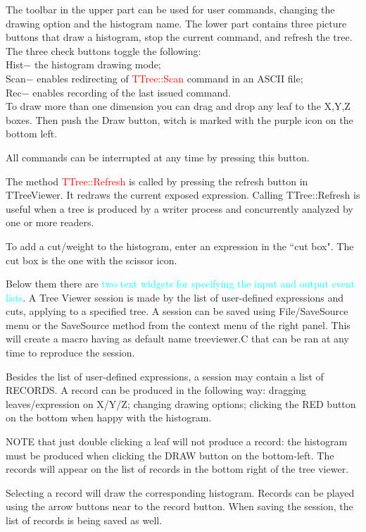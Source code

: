 \documentclass[12pt,a4paper]{article}
\begin{document}
The toolbar in the upper part can be used for user commands, changing the drawing option and the histogram name. The lower part contains three picture buttons that draw a histogram, stop the current command, and refresh the tree. The three check buttons toggle the following: \\
Hist$-$ the histogram drawing mode; \\
Scan$-$ enables redirecting of \textcolor{red}{TTree::Scan} command in an ASCII file; \\
Rec$-$ enables recording of the last issued command. \\

To draw more than one dimension you can drag and drop any leaf to the X,Y,Z boxes. Then push the Draw button, witch is marked with the purple icon on the bottom left.

All commands can be interrupted at any time by pressing this button.

The method \textcolor{red}{TTree::Refresh} is called by pressing the refresh button in TTreeViewer. It redraws the current exposed expression. Calling TTree::Refresh is useful when a tree is produced by a writer process and concurrently analyzed by one or more readers.

To add a cut/weight to the histogram, enter an expression in the ``cut box". The cut box is the one with the scissor icon.

Below them there are \textcolor{cyan}{two text widgets for specifying the input and output event lists}. A Tree Viewer session is made by the list of user-defined expressions and cuts, applying to a specified tree. A session can be saved using File/SaveSource menu or the SaveSource method from the context menu of the right panel. This will create a macro having as default name treeviewer.C that can be ran at any time to reproduce the session.

Besides the list of user-defined expressions, a session may contain a list of RECORDS. A record can be produced in the following way: dragging leaves/expression on X/Y/Z; changing drawing options; clicking the RED button on the bottom when happy with the histogram.

NOTE that just double clicking a leaf will not produce a record: the histogram must be produced when clicking the
DRAW button on the bottom-left. The records will appear on the list of records in the bottom right of the tree viewer.

Selecting a record will draw the corresponding histogram. Records can be played using the arrow buttons near to the record button. When saving the session, the list of records is being saved as well.
\end{document}
